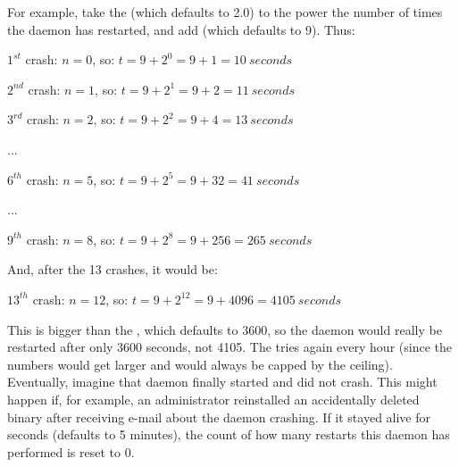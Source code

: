 For example, take the  (which defaults
to 2.0) to the power the number of times the daemon has restarted, and add
 (which defaults to 9).
Thus:

 $1^{st}$ crash:  $n = 0$, so: $t = 9 + 2^0 = 9 + 1 = 10\ seconds$

 $2^{nd}$ crash:  $n = 1$, so: $t = 9 + 2^1 = 9 + 2 = 11\ seconds$

 $3^{rd}$ crash:  $n = 2$, so: $t = 9 + 2^2 = 9 + 4 = 13\ seconds$

    ...

 $6^{th}$ crash:  $n = 5$, so: $t = 9 + 2^5 = 9 + 32 = 41\ seconds$

    ...

 $9^{th}$ crash:  $n = 8$, so: $t = 9 + 2^8 = 9 + 256 = 265\ seconds$

And, after the 13 crashes, it would be:

 $13^{th}$ crash:  $n = 12$, so: $t = 9 + 2^{12} = 9 + 4096 = 4105\ seconds$

This is bigger than the , which
defaults to 3600, so the daemon would really be restarted after only
3600 seconds, not 4105.
The  tries again every hour (since the numbers would
get larger and would always be capped by the ceiling).
Eventually, imagine that daemon finally started and did not crash.
This might happen if, for example, an administrator reinstalled
an accidentally deleted binary after receiving e-mail about
the daemon crashing.
If it stayed alive for
 seconds (defaults to 5 minutes),
the count of how many restarts this daemon has performed is reset to
0.


